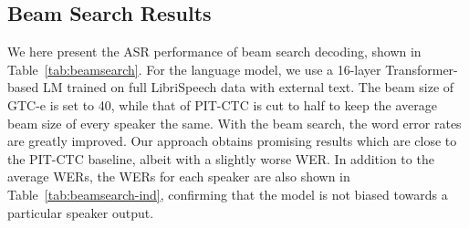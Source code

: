 \documentclass{article}
\begin{document}
\subsection{Beam Search Results}
\label{ssec:exp2}
We here present the ASR performance of beam search decoding, shown in Table~\ref{tab:beamsearch}. For the language model, we use a 16-layer Transformer-based LM trained on full LibriSpeech data with external text. The beam size of GTC-e is set to 40, while that of PIT-CTC is cut to half to keep the average beam size of every speaker the same. With the beam search, the word error rates are greatly improved. Our approach obtains promising results which are close to the PIT-CTC baseline, albeit with a slightly worse WER. In addition to the average WERs, the WERs for each speaker are also shown in Table~\ref{tab:beamsearch-ind}, confirming that the model is not biased towards a particular speaker output.

\begin{table}[t]
    \centering
    \caption{WER(\%) comparison between PIT-CTC and GTC-e using beam search decoding.}
    \label{tab:beamsearch}
    \vspace{-15pt}
\end{table}
\end{document}
